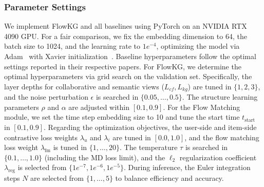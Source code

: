 

\subsubsection{\textbf{Parameter Settings}}
We implement FlowKG and all baselines using PyTorch on an NVIDIA RTX 4090 GPU. For a fair comparison, we fix the embedding dimension to 64, the batch size to 1024, and the learning rate to $1e^{-4}$, optimizing the model via Adam~\cite{kingma2014adam} with Xavier initialization~\cite{xavier2007unravelling}. Baseline hyperparameters follow the optimal settings reported in their respective papers. For FlowKG, we determine the optimal hyperparameters via grid search on the validation set. Specifically, the layer depths for collaborative and semantic views ($L_{cf}, L_{kg}$) are tuned in $\{1, 2, 3\}$, and the noise perturbation $\epsilon$ is searched in $\{0.05, \dots, 0.5\}$. The structure learning parameters $\rho$ and $\alpha$ are adjusted within $[0.1, 0.9]$. For the Flow Matching module, we set the time step embedding size to 10 and tune the start time $t_{\text{start}}$ in $[0.1, 0.9]$. Regarding the optimization objectives, the user-side and item-side contrastive loss weights $\lambda_{u}$ and $\lambda_{i}$ are tuned in $[0.0, 1.0]$, and the flow matching loss weight $\lambda_{\text{fm}}$ is tuned in $\{1, \dots, 20\}$. The temperature $\tau$ is searched in $\{0.1, \dots, 1.0\}$ (including the MD loss limit), and the $\ell_2$ regularization coefficient $\lambda_{\text{reg}}$ is selected from $\{1e^{-7}, 1e^{-6}, 1e^{-5}\}$. During inference, the Euler integration steps $N$ are selected from $\{1, \dots, 5\}$ to balance efficiency and accuracy.

